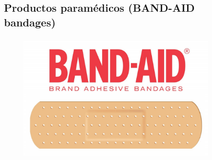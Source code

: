 \documentclass[compress, aspectratio=169]{beamer} %
\begin{document}
	\subsection{Productos paramédicos (BAND-AID bandages)}
		\begin{frame}
	\transdissolve[duration=1]

			\frametitle{\insertsubsection}
			
			\begin{figure}
				\includegraphics[width=10cm]{band.jpeg}
			\end{figure}
			
			
			
			
		\end{frame}
\end{document}
